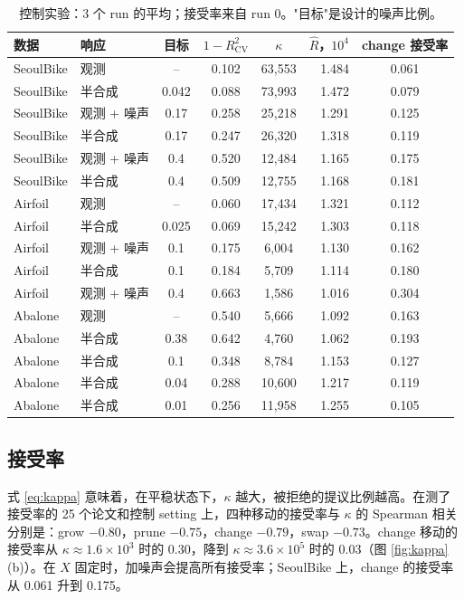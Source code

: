 \documentclass[11pt]{article}
\newcommand{\Rhat}{\hat R}
\begin{document}
\begin{table}[h]
\centering
\caption{控制实验：3 个 run 的平均；接受率来自 run 0。"目标"是设计的噪声比例。}
\label{tab:controlled}
\begin{tabular}{llcccrc}
\toprule
数据 & 响应 & 目标 & $1-R^2_{\mathrm{CV}}$ & $\kappa$ & $\Rhat$，$10^4$ & change 接受率 \\
\midrule
SeoulBike & 观测 & -- & 0.102 & 63{,}553 & 1.484 & 0.061 \\
SeoulBike & 半合成 & 0.042 & 0.088 & 73{,}993 & 1.472 & 0.079 \\
SeoulBike & 观测 + 噪声 & 0.17 & 0.258 & 25{,}218 & 1.291 & 0.125 \\
SeoulBike & 半合成 & 0.17 & 0.247 & 26{,}320 & 1.318 & 0.119 \\
SeoulBike & 观测 + 噪声 & 0.4 & 0.520 & 12{,}484 & 1.165 & 0.175 \\
SeoulBike & 半合成 & 0.4 & 0.509 & 12{,}755 & 1.168 & 0.181 \\
\midrule
Airfoil & 观测 & -- & 0.060 & 17{,}434 & 1.321 & 0.112 \\
Airfoil & 半合成 & 0.025 & 0.069 & 15{,}242 & 1.303 & 0.118 \\
Airfoil & 观测 + 噪声 & 0.1 & 0.175 & 6{,}004 & 1.130 & 0.162 \\
Airfoil & 半合成 & 0.1 & 0.184 & 5{,}709 & 1.114 & 0.180 \\
Airfoil & 观测 + 噪声 & 0.4 & 0.663 & 1{,}586 & 1.016 & 0.304 \\
\midrule
Abalone & 观测 & -- & 0.540 & 5{,}666 & 1.092 & 0.163 \\
Abalone & 半合成 & 0.38 & 0.642 & 4{,}760 & 1.062 & 0.193 \\
Abalone & 半合成 & 0.1 & 0.348 & 8{,}784 & 1.153 & 0.127 \\
Abalone & 半合成 & 0.04 & 0.288 & 10{,}600 & 1.217 & 0.119 \\
Abalone & 半合成 & 0.01 & 0.256 & 11{,}958 & 1.255 & 0.105 \\
\bottomrule
\end{tabular}
\end{table}

\subsection{接受率}
式 \eqref{eq:kappa} 意味着，在平稳状态下，$\kappa$ 越大，被拒绝的提议比例越高。在测了接受率的 25 个论文和控制 setting 上，四种移动的接受率与 $\kappa$ 的 Spearman 相关分别是：grow $-0.80$，prune $-0.75$，change $-0.79$，swap $-0.73$。change 移动的接受率从 $\kappa\approx1.6\times10^3$ 时的 0.30，降到 $\kappa\approx3.6\times10^5$ 时的 0.03（图 \ref{fig:kappa}(b)）。在 $X$ 固定时，加噪声会提高所有接受率；SeoulBike 上，change 的接受率从 0.061 升到 0.175。
\end{document}
